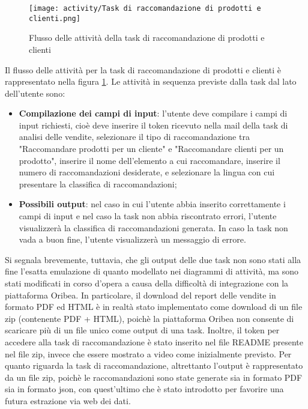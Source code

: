\begin{figure}[!h]
    \centering 
    \texttt{[image: activity/Task di raccomandazione di prodotti e clienti.png]}
    \caption{Flusso delle attività della task di raccomandazione di prodotti e clienti}
    \label{fig:activity-recommendation-products-customers}
\end{figure}

Il flusso delle attività per la task di raccomandazione di prodotti e clienti è rappresentato nella figura \ref{fig:activity-recommendation-products-customers}. Le attività in sequenza previste dalla task dal lato dell'utente sono:
\begin{itemize}
    \item \textbf{Compilazione dei campi di input}: l'utente deve compilare i campi di input richiesti, cioè deve inserire il token ricevuto nella mail della task di analisi delle vendite, selezionare il tipo di raccomandazione tra "Raccomandare prodotti per un cliente" e "Raccomandare clienti per un prodotto", inserire il nome dell'elemento a cui raccomandare, inserire il numero di raccomandazioni desiderate, e selezionare la lingua con cui presentare la classifica di raccomandazioni;
    \item \textbf{Possibili output}: nel caso in cui l'utente abbia inserito correttamente i campi di input e nel caso la task non abbia riscontrato errori, l'utente visualizzerà la classifica di raccomandazioni generata. In caso la task non vada a buon fine, l'utente visualizzerà un messaggio di errore.
\end{itemize}

Si segnala brevemente, tuttavia, che gli output delle due task non sono stati alla fine l'esatta emulazione di quanto modellato nei diagrammi di attività, ma sono stati modificati in corso d'opera a causa della difficoltà di integrazione con la piattaforma Oribea. In particolare, il download del report delle vendite in formato PDF ed HTML è in realtà stato implementato come download di un file zip (contenente PDF + HTML), poichè la piattaforma Oribea non consente di scaricare più di un file unico come output di una task. Inoltre, il token per accedere alla task di raccomandazione è stato inserito nel file README presente nel file zip, invece che essere mostrato a video come inizialmente previsto. Per quanto riguarda la task di raccomandazione, altrettanto l'output è rappresentato da un file zip, poichè le raccomandazioni sono state generate sia in formato PDF sia in formato \gls{json}, con quest'ultimo che è stato introdotto per favorire una futura estrazione via web dei dati.



